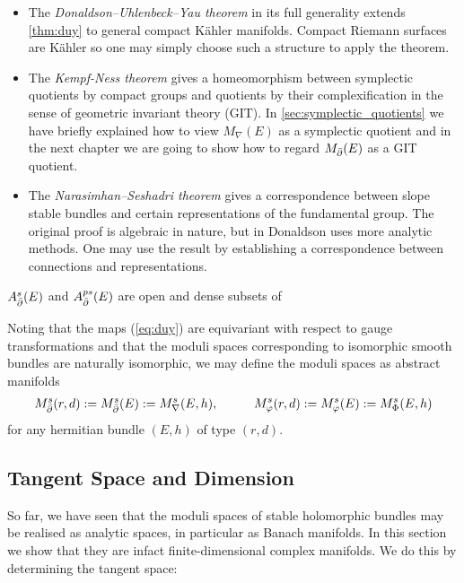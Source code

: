 \documentclass[12pt]{ociamthesis}  %
\begin{document}
\begin{itemize}
  \item The \emph{Donaldson–Uhlenbeck–Yau theorem}
        \cite{donaldson1985,uy1986}
        in its full generality extends \ref{thm:duy} to general compact
        K\"ahler manifolds. Compact Riemann surfaces
        are K\"ahler so one may simply choose such a structure to
        apply the theorem.
  \item The \emph{Kempf-Ness theorem} \cite{kn1979} gives a homeomorphism between
        symplectic quotients by compact groups and quotients by their
        complexification in the sense of geometric invariant theory (GIT). In
        \ref{sec:symplectic_quotients} we have briefly
        explained how to view $M_\nabla(E)$ as a symplectic quotient
        and in the next chapter we are going to show how to regard
        $M_{\bar{\partial}}(E)$ as a GIT quotient.
  \item The \emph{Narasimhan–Seshadri theorem} \cite{ns1965} gives
        a correspondence between slope stable bundles and certain representations
        of the fundamental group. The original proof is algebraic in nature, but in \cite{donaldson1983} Donaldson
        uses more analytic methods. One may use the result by establishing
        a correspondence between connections and representations.
\end{itemize}


\begin{lemma}
  $A^s_{{\bar{\partial}}}(E)$ and $A^{ps}_{{\bar{\partial}}}(E)$ are open and dense subsets
  of 
\end{lemma}

Noting that the maps (\ref{eq:duy}) are equivariant with respect
to gauge transformations and that the moduli spaces corresponding
to isomorphic smooth bundles are naturally isomorphic, we may define
the moduli spaces as abstract manifolds
\begin{align}\label{eq:abstract_analytic_spaces}
  M^s_{\bar{\partial}}(r,d) := M^s_{\bar{\partial}}(E) := M^s_\nabla(E,h), \hspace{1cm}
  M^s_\varphi(r,d) := M^s_\varphi(E) := M^s_\Phi(E,h)
\end{align}
for any hermitian bundle $(E,h)$ of type $(r,d)$.

\subsection{Tangent Space and Dimension}

So far, we have seen that the moduli spaces of stable holomorphic
bundles may be realised as analytic spaces, in particular as
Banach manifolds. In this section we show that they are infact
finite-dimensional complex manifolds. We do this by determining
the tangent space:
\end{document}
